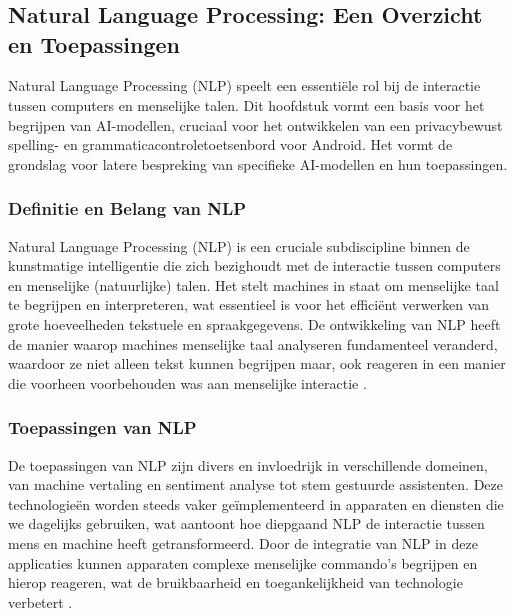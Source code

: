 \chapter{}%
\label{ch:stand-van-zaken}



\section{Natural Language Processing: Een Overzicht en Toepassingen}

Natural Language Processing (NLP) speelt een essentiële rol bij de interactie tussen computers en menselijke talen. Dit hoofdstuk vormt een basis voor het begrijpen van AI-modellen, cruciaal voor het ontwikkelen van een privacybewust spelling- en grammaticacontroletoetsenbord voor Android. Het vormt de grondslag voor latere bespreking van specifieke AI-modellen en hun toepassingen.


\subsection{Definitie en Belang van NLP}

Natural Language Processing (NLP) is een cruciale subdiscipline binnen de kunstmatige intelligentie die zich bezighoudt met de interactie tussen computers en menselijke (natuurlijke) talen. Het stelt machines in staat om menselijke taal te begrijpen en interpreteren, wat essentieel is voor het efficiënt verwerken van grote hoeveelheden tekstuele en spraakgegevens. De ontwikkeling van NLP heeft de manier waarop machines menselijke taal analyseren fundamenteel veranderd, w\-aar\-door ze niet alleen tekst kunnen begrijpen maar, ook reageren in een manier die voorheen voorbehouden was aan menselijke interactie \autocite{Sanadi2022}.

\subsection{Toepassingen van NLP}

De toepassingen van NLP zijn divers en invloedrijk in verschillende domeinen, van machine vertaling en sentiment analyse tot stem gestuurde assistenten. Deze technologieën worden steeds vaker geïmplementeerd in apparaten en diensten die we dagelijks gebruiken, wat aantoont hoe diepgaand NLP de interactie tussen mens en machine heeft getransformeerd. Door de integratie van NLP in deze applicaties kunnen apparaten complexe menselijke commando's begrijpen en hierop reageren, wat de bruikbaarheid en toegankelijkheid van technologie verbetert \hfill \break \autocite{Feng2020}.

